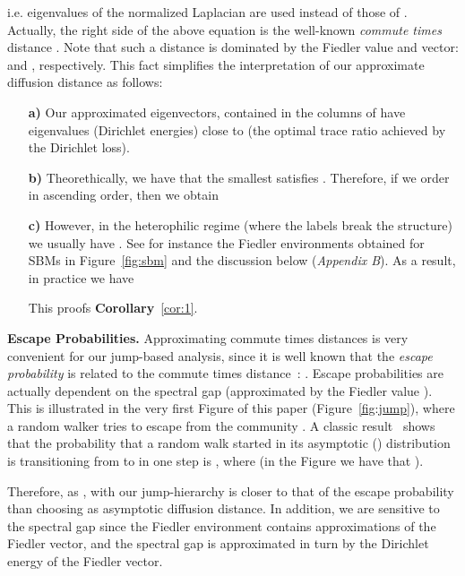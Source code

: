 \documentclass{article}
\theoremstyle{plain}
\theoremstyle{definition}
\begin{document}
i.e. eigenvalues  of the normalized Laplacian  are used instead of those of . Actually, the right side of the above equation is the well-known \emph{commute times}~\citep{Chandra89} distance . Note that such a distance is dominated by the Fiedler value and vector:  and , respectively. This fact simplifies the interpretation of our approximate diffusion distance as follows:
\begin{itemize}
    \item [\textbf{a)}] Our approximated eigenvectors, contained in the  columns of  have eigenvalues (Dirichlet energies)  close to  (the optimal trace ratio achieved by the Dirichlet loss). 
    \item [\textbf{b)}] Theorethically, we have that the smallest  satisfies . Therefore, if we order  in ascending order, then we obtain  
    
    \item [\textbf{c)}] However, in the heterophilic regime (where the labels break the structure) we usually have . See for instance the Fiedler environments obtained for SBMs in Figure~\ref{fig:sbm} and the discussion below (\emph{Appendix B}). As a result, in practice we have
    
    This proofs \textbf{Corollary}~\ref{cor:1}.    
\end{itemize}

\textbf{Escape Probabilities.} Approximating commute times distances is very convenient for our jump-based analysis, since it is well known that the \emph{escape probability} is related to the commute times distance~\citep{doyle2000random}: . Escape probabilities are actually dependent on the spectral gap (approximated by the Fiedler value ). This is illustrated in the very first Figure of this paper (Figure~\ref{fig:jump}), where a random walker tries to escape from the community . A classic result~\citep{pmlr-vR3-meila01a} shows that the probability that a random walk started in its asymptotic () distribution  is transitioning from  to  in one step is , where  (in the Figure we have that ). 

Therefore, as , with  our jump-hierarchy is closer to that of the escape probability than choosing  as asymptotic diffusion distance. In addition, we are sensitive to the spectral gap since the Fiedler environment contains approximations of the Fiedler vector, and the spectral gap is approximated in turn by the Dirichlet energy of the Fiedler vector. 
\end{document}
